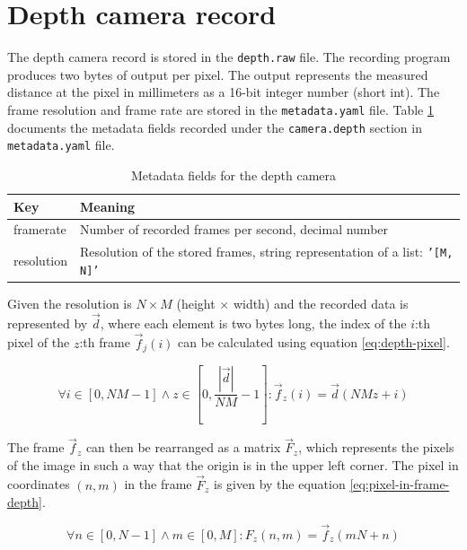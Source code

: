 \section{Depth camera record}   
\label{sec:depth-file}
The depth camera record is stored in the \texttt{depth.raw} file.
The recording program produces two bytes of output per pixel.
The output represents the measured distance at the pixel in millimeters as a 16-bit integer number (short int).
The frame resolution and frame rate are stored in the \texttt{metadata.yaml} file.
Table \ref{tab:depth-metadata} documents the metadata fields recorded under the \texttt{camera.depth} section in \texttt{metadata.yaml} file.
\begin{table}
    \begin{tabular}{l l}
        \toprule
        \textbf{Key} & \textbf{Meaning} \\
        \midrule
        framerate & Number of recorded frames per second, decimal number \\
        resolution & Resolution of the stored frames, string representation of a list: \texttt{'[M, N]'} \\
        \bottomrule
    \end{tabular}
    \caption{Metadata fields for the depth camera}
    \label{tab:depth-metadata}
\end{table}

Given the resolution is $N \times M$ (height $\times$ width) and the recorded data is represented by $\vec{d}$,
where each element is two bytes long, the index of the $i$:th pixel of the $z$:th frame $\vec{f}_{j}(i)$ can be calculated using equation \ref{eq:depth-pixel}.

\begin{equation}
    \label{eq:depth-pixel}
    \forall i \in \left[ 0, NM-1 \right] \land z \in \left[ 0, \frac{| \vec{d} |}{NM}-1 \right] : \vec{f}_{z}(i) = \vec{d}(NMz+i)
\end{equation}

The frame $\vec{f}_z$ can then be rearranged as a matrix $\vec{F}_z$,
which represents the pixels of the image in such a way that the origin is in the upper left corner.
The pixel in coordinates $(n,m)$ in the frame $\vec{F}_z$ is given by the equation \ref{eq:pixel-in-frame-depth}.

\begin{equation}
    \label{eq:pixel-in-frame-depth}
    \forall n \in [0, N-1] \land m \in [0, M] : F_{z}(n,m) = \vec{f}_{z}(mN+n)
\end{equation}

